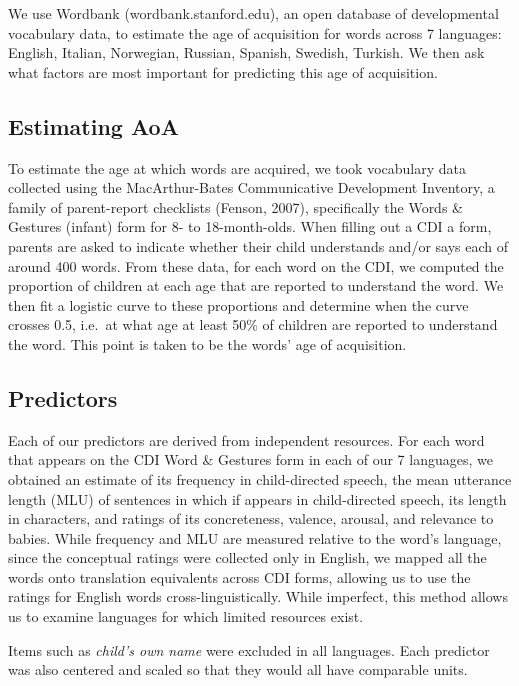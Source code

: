 \documentclass[10pt, letterpaper]{article}
\begin{document}
We use Wordbank (wordbank.stanford.edu), an open database of
developmental vocabulary data, to estimate the age of acquisition for
words across 7 languages: English, Italian, Norwegian, Russian, Spanish,
Swedish, Turkish. We then ask what factors are most important for
predicting this age of acquisition.

\subsection{Estimating AoA}\label{estimating-aoa}

To estimate the age at which words are acquired, we took vocabulary data
collected using the MacArthur-Bates Communicative Development Inventory,
a family of parent-report checklists (Fenson, 2007), specifically the
Words \& Gestures (infant) form for 8- to 18-month-olds. When filling
out a CDI a form, parents are asked to indicate whether their child
understands and/or says each of around 400 words. From these data, for
each word on the CDI, we computed the proportion of children at each age
that are reported to understand the word. We then fit a logistic curve
to these proportions and determine when the curve crosses 0.5, i.e.~at
what age at least 50\% of children are reported to understand the word.
This point is taken to be the words' age of acquisition.

\subsection{Predictors}\label{predictors}

Each of our predictors are derived from independent resources. For each
word that appears on the CDI Word \& Gestures form in each of our 7
languages, we obtained an estimate of its frequency in child-directed
speech, the mean utterance length (MLU) of sentences in which if appears
in child-directed speech, its length in characters, and ratings of its
concreteness, valence, arousal, and relevance to babies. While frequency
and MLU are measured relative to the word's language, since the
conceptual ratings were collected only in English, we mapped all the
words onto translation equivalents across CDI forms, allowing us to use
the ratings for English words cross-linguistically. While imperfect,
this method allows us to examine languages for which limited resources
exist.

Items such as \emph{child's own name} were excluded in all languages.
Each predictor was also centered and scaled so that they would all have
comparable units.
\end{document}
